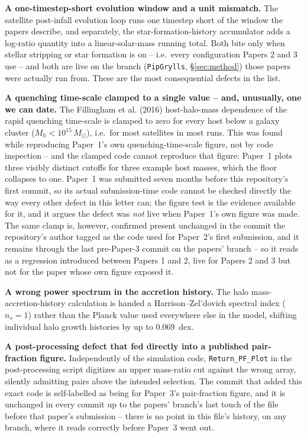 \documentclass[fleqn,usenatbib]{mnras}
\begin{document}
\textbf{A one-timestep-short evolution window and a unit mismatch.} The
satellite post-infall evolution loop runs one timestep short of the
window the papers describe, and separately, the star-formation-history
accumulator adds a log-ratio quantity into a linear-solar-mass running
total. Both bite only when stellar stripping or star formation is on --
i.e.\ every configuration Papers 2 and 3 use -- and both are live on the
branch (\texttt{PipGrylls}, \S\ref{sec:method}) those papers were
actually run from. These are the most consequential defects in the
list.

\textbf{A quenching time-scale clamped to a single value -- and, unusually,
one we can date.} The Fillingham et al. (2016) host-halo-mass
dependence of the rapid quenching time-scale is clamped to zero for
every host below a galaxy cluster ($M_h < 10^{15}\,M_\odot$), i.e.\ for
most satellites in most runs. This was found while reproducing
Paper~1's own quenching-time-scale figure, not by code inspection --
and the clamped code cannot reproduce that figure: Paper~1 plots three
visibly distinct cutoffs for three example host masses, which the
floor collapses to one. Paper~1 was submitted seven months before this
repository's first commit, so its actual submission-time code cannot
be checked directly the way every other defect in this letter can; the
figure test is the evidence available for it, and it argues the defect
was \emph{not} live when Paper~1's own figure was made. The same clamp
is, however, confirmed present unchanged in the commit the repository's
author tagged as the code used for Paper~2's first submission, and it
remains through the last pre-Paper-3 commit on the papers' branch --
so it reads as a regression introduced between Papers 1 and 2, live for
Papers 2 and 3 but not for the paper whose own figure exposed it.

\textbf{A wrong power spectrum in the accretion history.} The halo
mass-accretion-history calculation is handed a Harrison--Zel'dovich
spectral index ($n_s = 1$) rather than the Planck value used everywhere
else in the model, shifting individual halo growth histories by up to
$0.069$~dex.

\textbf{A post-processing defect that fed directly into a published pair-fraction figure.} Independently of the simulation code,
\texttt{Return\_PF\_Plot} in the post-processing script digitizes an
upper mass-ratio cut against the wrong array, silently admitting pairs
above the intended selection. The commit that added this exact code
is self-labelled as being for Paper~3's pair-fraction figure, and it
is unchanged in every commit up to the papers' branch's last touch of
the file before that paper's submission -- there is no point in this
file's history, on any branch, where it reads correctly before Paper~3
went out.
\end{document}
